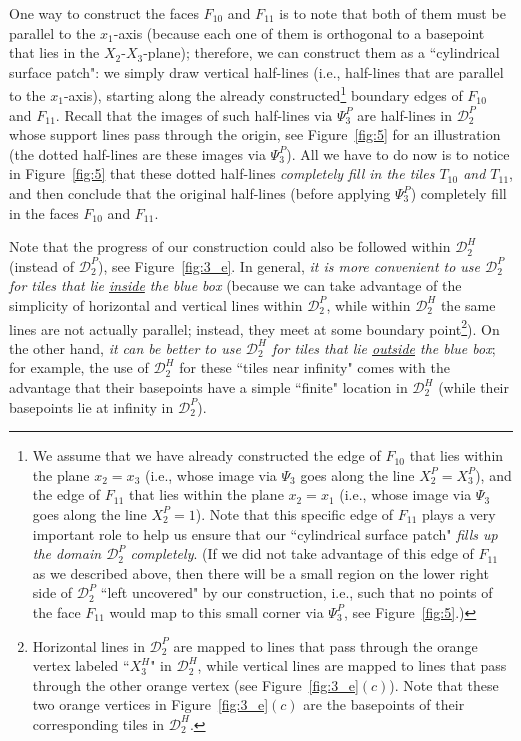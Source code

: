 \documentclass[12pt,letterpaper]{article}
\newcommand{\D}{\mathcal{D}}
\begin{document}
One way to construct the  faces $F_{10}$ and $F_{11}$ is to note that both of them must be parallel to the $x_1$-axis (because each one of them is orthogonal to a basepoint that lies in the $X_2$-$X_3$-plane); therefore, we can construct them as  a ``cylindrical surface patch": we simply draw vertical half-lines (i.e., half-lines that are parallel to the $x_1$-axis), starting along the already constructed\footnote{We assume that we have already constructed the edge of $F_{10}$ that lies within the plane $x_2 = x_3$ (i.e., whose image via $\Psi_3$ goes along the line $X_2^P = X_3^P$), and the edge of $F_{11}$  that lies within the plane $x_2 = x_1$ (i.e., whose image via $\Psi_3$ goes along the line $X_2^P = 1$). Note that this specific edge of $F_{11}$ plays a very important role to help us ensure that our ``cylindrical surface patch" {\em fills up the domain $\D_2^P$ completely}. (If we did not take advantage of  this edge of $F_{11}$ as we described above, then there will be a small  region on the lower right side of $\D_2^P$  ``left uncovered" by our construction, i.e., such that no points of the face $F_{11}$ would map to this small corner via $\Psi_3^P$, see Figure~\ref{fig:5}.)} boundary edges of $F_{10}$ and $F_{11}$. Recall that the images of such half-lines via $\Psi_3^P$ are half-lines in $\mathscr{D}_2^P$ whose support lines pass through the origin, see Figure~\ref{fig:5} for an illustration (the dotted half-lines are these images via $\Psi_3^P$). All we have to do now is to notice in Figure~\ref{fig:5}  that these dotted half-lines {\em completely fill in the tiles $T_{10}$ and $T_{11}$}, and then conclude that the original half-lines (before applying $\Psi_3^P$) completely fill in the faces $F_{10}$ and $F_{11}$. 


Note  that the progress of our construction could also be followed within $\mathscr{D}_2^H$ (instead of $\mathscr{D}_2^P$), see Figure~\ref{fig:3_e}. 
In general, {\em it is more convenient to use  $\mathscr{D}_2^P$ for tiles that lie \underline{inside} the blue box} (because we can take advantage of the simplicity of horizontal and vertical lines within $\mathscr{D}_2^P$, while within $\mathscr{D}_2^H$ the same lines are not actually parallel; instead, they meet at some boundary point\footnote{Horizontal lines in $\mathscr{D}_2^P$ are mapped to lines that pass through the orange vertex labeled ``$X_3^H$" in $\mathscr{D}_2^H$, while vertical lines are mapped to lines that pass through the other orange vertex (see Figure~\ref{fig:3_e}$(c)$). Note that these two orange vertices in Figure~\ref{fig:3_e}$(c)$ are the basepoints of their corresponding tiles in $\mathscr{D}_2^H$.}). On the other hand, {\em it can be better to use $\mathscr{D}_2^H$ for tiles that lie \underline{outside} the blue box}; for example, the use of $\mathscr{D}_2^H$ for these ``tiles near infinity" comes with the advantage that their basepoints have a simple ``finite" location in $\mathscr{D}_2^H$ (while their basepoints lie at infinity in $\mathscr{D}_2^P$).
\end{document}
